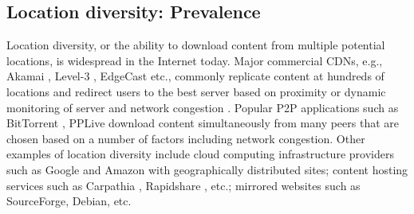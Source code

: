 









\subsection{Location diversity: Prevalence}



Location diversity, or the ability to download content from multiple potential locations, is widespread in the Internet today. Major commercial CDNs, e.g., Akamai \cite{Akamai}, Level-3 \cite{Level-3}, EdgeCast \cite{edgecast} etc., commonly replicate content at hundreds of locations and redirect users to the best server based on proximity or dynamic monitoring of server and network congestion \cite{akamai-detour}. Popular P2P applications such as BitTorrent \cite{bittorrentprotocol}, PPLive \cite{PPLive} download content simultaneously from many peers that are chosen based on a number of factors including network congestion. Other examples of location diversity include cloud computing infrastructure providers such as Google and Amazon with geographically distributed sites; content hosting services such as Carpathia \cite{Carpathia}, Rapidshare \cite{OneClickHosting}, etc.; mirrored websites such as SourceForge, Debian, etc. 

